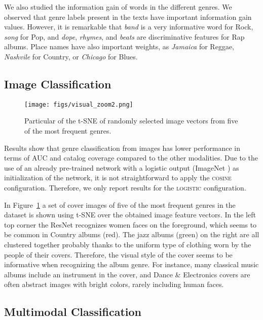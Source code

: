 \documentclass{article}
\begin{document}
We also studied the information gain of words in the different genres. We observed that genre labels present in the texts have important information gain values. However, it is remarkable that \textit{band} is a very informative word for Rock, \textit{song} for Pop, and \textit{dope}, \textit{rhymes}, and \textit{beats} are discriminative features for Rap albums. Place names have also important weights, as \textit{Jamaica} for Reggae, \textit{Nashvile} for Country, or \textit{Chicago} for Blues.

\subsection{Image Classification}\label{sec:imageexp}


\begin{figure}
\centering
\texttt{[image: figs/visual\_zoom2.png]} \\ 
\caption{Particular of the t-SNE of randomly selected image vectors from five of the most frequent genres.}
\label{fig:tsne_visual}
\end{figure}

Results show that genre classification from images has lower performance in terms of AUC and catalog coverage compared to the other modalities. Due to the use of an already pre-trained network with a logistic output (ImageNet \cite{ILSVRC15}) as initialization of the network, it is not straightforward to apply the \textsc{cosine} configuration. Therefore, we only report results for the \textsc{logistic} configuration.

In Figure~\ref{fig:tsne_visual} a set of cover images of five of the most frequent genres in the dataset is shown using t-SNE over the obtained image feature vectors. 
In the left top corner the ResNet recognizes women faces on the foreground, which seems to be common in Country albums (red).
The jazz albums (green) on the right are all clustered together probably thanks to the uniform type of clothing worn by the people of their covers. 
Therefore, the visual style of the cover seems to be informative when recognizing the album genre.
For instance, many classical music albums include an instrument in the cover, and Dance \& Electronics covers are often abstract images with bright colors, rarely including human faces.

\subsection{Multimodal Classification}\label{sec:multiexp}
\end{document}
